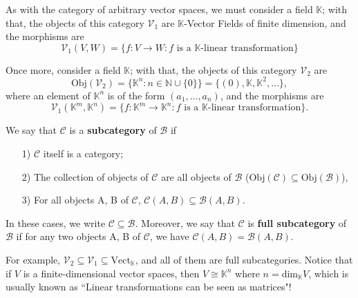\documentclass[../category_theory.tex]{subfiles}
\begin{document}
\begin{example}
	As with the category of arbitrary vector spaces, we must consider a field \(\mathbb{K}\); with that, the objects of this category \(\mathcal{V}_{1}\) are \(\mathbb{K}\)-Vector Fields of finite dimension, and the morphisms are
	\[
		\mathcal{V}_{1}(V, W)=\{f:V\rightarrow W: f \text{ is a \(\mathbb{K}\)-linear transformation}\}
	\]
\end{example}
\begin{example}
	Once more, consider a field \(\mathbb{K}\); with that, the objects of this category \(\mathcal{V}_{2}\) are
	\[
		\mathrm{Obj}(\mathcal{V}_{2})=\{\mathbb{K}^{n}:n \in \mathbb{N}\cup \{0\} \} = \{(0), \mathbb{K}, \mathbb{K}^{2}, \dotsc \},
	\]
	where an element of \(\mathbb{K}^{n}\) is of the form \((a_{1},\dotsc , a_{n})\), and the morphisms are
	\[
		\mathcal{V}_{1}(\mathbb{K}^{m}, \mathbb{K}^{n})=\{f:\mathbb{K}^{m}\rightarrow \mathbb{K}^{n}: f \text{ is a \(\mathbb{K}\)-linear transformation}\}.
	\]
\end{example}
\begin{def*}
	We say that \(\mathcal{C}\) is a \textbf{subcategory} of \(\mathcal{B}\) if
	\begin{itemize}
		\item[1)] \(\mathcal{C}\) itself is a category;
		\item[2)] The collection of objects of \(\mathcal{C}\) are all objects of \(\mathcal{B}\) (\(\mathrm{Obj}(\mathcal{C})\subseteq \mathrm{Obj}(\mathcal{B})\)),
		\item[3)] For all objects A, B of \(\mathcal{C}\), \(\mathcal{C}(A, B)\subseteq \mathcal{B}(A, B)\).
	\end{itemize}
	In these cases, we write \(\mathcal{C}\subseteq \mathcal{B}\). Moreover, we say that \(\mathcal{C}\) is  \textbf{full subcategory} of \(\mathcal{B}\) if for any two objects A, B of \(\mathcal{C}\), we have \(\mathcal{C}(A, B)=\mathcal{B}(A, B)\).
\end{def*}
\begin{example}
	For example, \(\mathcal{V}_{2}\subseteq \mathcal{V}_{1}\subseteq \mathrm{Vect}_{\mathbb{K}}\), and all of them are full subcategories. Notice that if \(V\) is a finite-dimensional vector spaces, then \(V \cong \mathbb{K}^{n}\) where \(n=\mathrm{dim}_{\mathbb{K}}V\), which is usually known as ``Linear transformations can be seen as matrices"!
\end{example}
\end{document}
